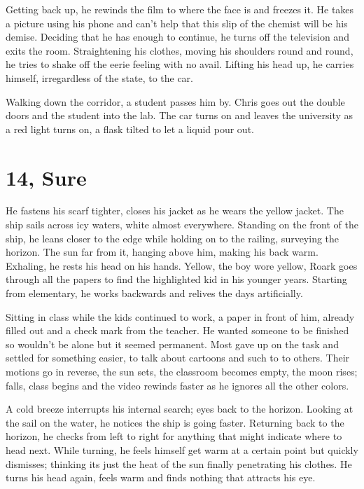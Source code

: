         Getting back up, he rewinds the film to where the face is and freezes it. He takes a picture using his phone and can't help that this
    slip of the chemist will be his demise. Deciding that he has enough to continue, he turns off the television and exits the room. 
    Straightening his clothes, moving his shoulders round and round, he tries to shake off the eerie feeling with no avail. Lifting his head up,
    he carries himself, irregardless of the state, to the car. 

        Walking down the corridor, a student passes him by. Chris goes out the double doors and the student into the lab. The car turns on and
    leaves the university as a red light turns on, a flask tilted to let a liquid pour out.

\section{14, Sure}

        He fastens his scarf tighter, closes his jacket as he wears the yellow jacket. The ship sails across icy waters, white almost everywhere.
    Standing on the front of the ship, he leans closer to the edge while holding on to the railing, surveying the horizon. The sun far from it,
    hanging above him, making his back warm. Exhaling, he rests his head on his hands. Yellow, the boy wore yellow, Roark goes through all the
    papers to find the highlighted kid in his younger years. Starting from elementary, he works backwards and relives the days artificially.

        Sitting in class while the kids continued to work, a paper in front of him, already filled out and a check mark from the teacher. He
    wanted someone to be finished so wouldn't be alone but it seemed permanent. Most gave up on the task and settled for something easier, to 
    talk about cartoons and such to to others. Their motions go in reverse, the sun sets, the classroom becomes empty, the moon rises; falls, 
    class begins and the video rewinds faster as he ignores all the other colors. 

        A cold breeze interrupts his internal search; eyes back to the horizon. Looking at the sail on the water, he notices the ship is going
    faster. Returning back to the horizon, he checks from left to right for anything that might indicate where to head next. While turning,
    he feels himself get warm at a certain point but quickly dismisses; thinking its just the heat of the sun finally penetrating his clothes.
    He turns his head again, feels warm and finds nothing that attracts his eye.

